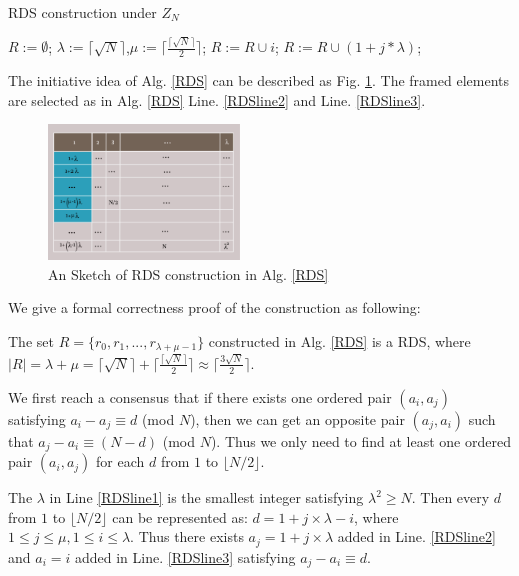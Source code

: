 \begin{algorithm}[!h]
\caption{RDS construction under $Z_N$}
\label{RDS}
\begin{algorithmic}[1]
\STATE $R :=\emptyset$;
\STATE $\lambda :=\lceil \sqrt{N}  \rceil$,$\mu :=\lceil \frac{\lceil \sqrt{N} \rceil}{2} \rceil$;\label{RDSline1}
	\STATE $R :=R \cup i$; \label{RDSline2}
\ENDFOR
{}
	\STATE $R :=R \cup (1 + j * \lambda )$; \label{RDSline3}
\ENDFOR
\end{algorithmic}
\end{algorithm}


The initiative idea of Alg. \ref{RDS} can be described as Fig. \ref{matrix}. 
The framed elements are selected as in Alg. \ref{RDS} 
Line. \ref{RDSline2} and Line. \ref{RDSline3}. 


\begin{figure}[!h]
\centering
\includegraphics[width=2in]{./Figure/matrix}
\caption{An Sketch of RDS construction in Alg. \ref{RDS}}
\label{matrix}
\end{figure}

We give a formal correctness proof of the construction as following:

\begin{theorem}
\label{RDS1}
The set $R = \{r_0, r_1, ..., r_{\lambda + \mu - 1}\}$ constructed in Alg. \ref{RDS} is a RDS,
where $|R| = \lambda + \mu = \lceil \sqrt{N}  \rceil + \lceil \frac{\lceil \sqrt{N} \rceil}{2} \rceil
\approx \lceil \frac{3\sqrt{N}}{2}  \rceil$.
\end{theorem}


\begin{IEEEproof}
We first reach a consensus that if there exists one ordered 
pair $(a_i,a_j)$ satisfying  $a_i - a_j \equiv d$ (mod $N$),
then we can get an opposite pair $(a_j,a_i)$ such that  
$a_j - a_i \equiv (N-d)$ (mod $N$). Thus we only need to find 
at least one ordered pair $(a_i,a_j)$ for each $d$ from $1$ to $\lfloor N/2 \rfloor$.

The $\lambda$ in Line \ref{RDSline1} is the smallest integer satisfying 
$\lambda^2 \geq N$. Then every $d$ from $1$ to $\lfloor N/2 \rfloor$ 
can be represented as: $ d = 1 + j \times \lambda - i$, where $1 \leq j \leq \mu, 
1 \leq i \leq \lambda$. Thus there exists $a_j = 1 + j \times \lambda$ 
added in Line. \ref{RDSline2} and $a_i = i$ added in Line. \ref{RDSline3} 
satisfying  $a_j - a_i \equiv d$.
\end{IEEEproof}



